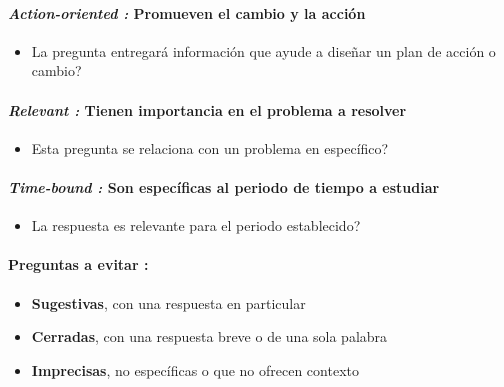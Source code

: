 \paragraph{\textit{Action-oriented : }Promueven el cambio y la acción}
\begin{itemize}
    \item {La pregunta entregará información que ayude a diseñar un plan de acción o cambio?}
\end{itemize}

\paragraph{\textit{Relevant : }Tienen importancia en el problema a resolver}
\begin{itemize}
    \item {Esta pregunta se relaciona con un problema en específico?}
\end{itemize}

\paragraph{\textit{Time-bound : }Son específicas al periodo de tiempo a estudiar}
\begin{itemize}
    \item {La respuesta es relevante para el periodo establecido?}
\end{itemize}

\paragraph{Preguntas a evitar : }
\begin{itemize}
    \item {\textbf{Sugestivas}, con una respuesta en particular}
    \item {\textbf{Cerradas}, con una respuesta breve o de una sola palabra}
    \item {\textbf{Imprecisas}, no específicas o que no ofrecen contexto}
\end{itemize}

\newpage